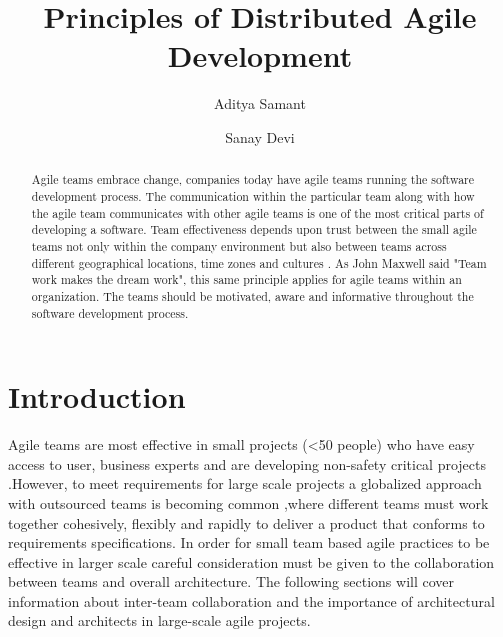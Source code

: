 \documentclass[sigplan,screen]{acmart}
\begin{document}
\title{Principles of Distributed Agile Development}
\author{Aditya Samant}
\author{Sanay Devi}


\begin{abstract}
Agile teams embrace change, companies today have agile teams running the software development process. The communication within the particular team along with how the agile team communicates with other agile teams is one of the most critical parts of developing a software. Team effectiveness depends upon trust between the small agile teams not only within the company environment but also between teams across different geographical locations, time zones and cultures \cite{Siva13}. As John Maxwell said "Team work makes the dream work", this same principle applies for agile teams within an organization. The teams should be motivated, aware and informative throughout the software development process. 
\end{abstract}

\maketitle



\section{Introduction}
Agile teams are most effective in small projects (<50 people) who have easy access to user, business experts and are developing non-safety critical projects \cite{Dingsoyr} .However, to meet requirements for large scale projects a globalized approach with outsourced teams is becoming common \cite{Jeff},where different teams must work together cohesively, flexibly and rapidly to deliver  a product that conforms to requirements specifications. In order for small team based agile practices to be effective in larger scale careful consideration must be given to the collaboration between teams and overall architecture. The following sections will cover information about inter-team collaboration and the importance of architectural design and architects in large-scale agile projects. 
 
\end{document}
